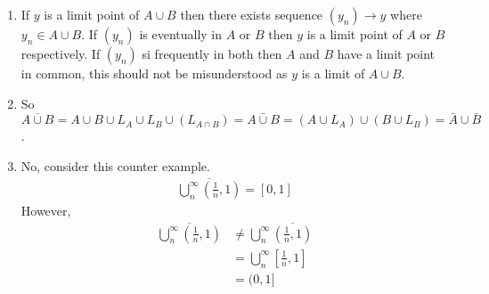 \begin{enumerate}[label=(\alph*)]
    \item 
    If $y$ is a limit point of $A\cup B$ then there exists sequence $(y_n)\rightarrow y$
    where $y_n \in A\cup B$. If $(y_n)$ is eventually in $A$ or $B$ then $y$ is a limit point
    of $A$ or $B$ respectively. If $(y_n)$ si frequently in both then $A$ and $B$ have a limit point
    in common, this should not be misunderstood as $y$ is a limit of $A\cup B$.

    \item 
    So $\overline{A\cup B} = A\cup B \cup L_A \cup L_B \cup (L_{A\cap B}) = 
    \bar{A\cup B} = (A\cup L_A)  \cup ( B  \cup L_B) = \bar A \cup \bar B$.

    \item
    No, consider this counter example. 
    \begin{align*}
        \overline{\bigcup_n^\infty (\frac{1}{n}, 1)} = [0,1]
    \end{align*}
    However,
    \begin{align*}
        \overline{\bigcup_n^\infty (\frac{1}{n}, 1)} &\neq \bigcup_n^\infty \overline{(\frac{1}{n}, 1)} \\
                                                    &= \bigcup_n^\infty [\frac{1}{n}, 1] \\
                                                    &= (0,1]
    \end{align*}
\end{enumerate}


